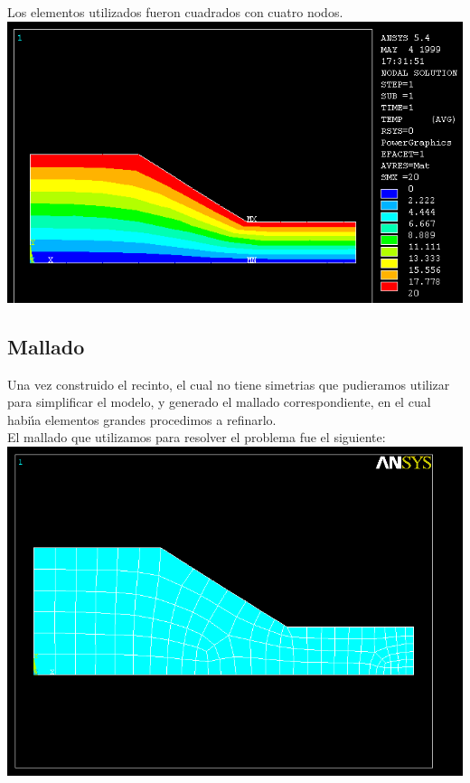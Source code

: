 \documentclass[a4paper,11pt]{article}
\begin{document}
Los elementos utilizados fueron cuadrados con cuatro nodos.\\

\includegraphics[scale=0.5]{4nodos.png}

\newpage

\subsection{Mallado}

Una vez construido el recinto, el cual no tiene simetrias que pudieramos
utilizar para simplificar el modelo, y generado el mallado correspondiente, en 
el cual habi\'{\i}a elementos grandes procedimos a refinarlo. \\

El mallado que utilizamos para resolver el problema fue el siguiente:\\

\includegraphics[scale=0.5]{malla2.png}
\end{document}
